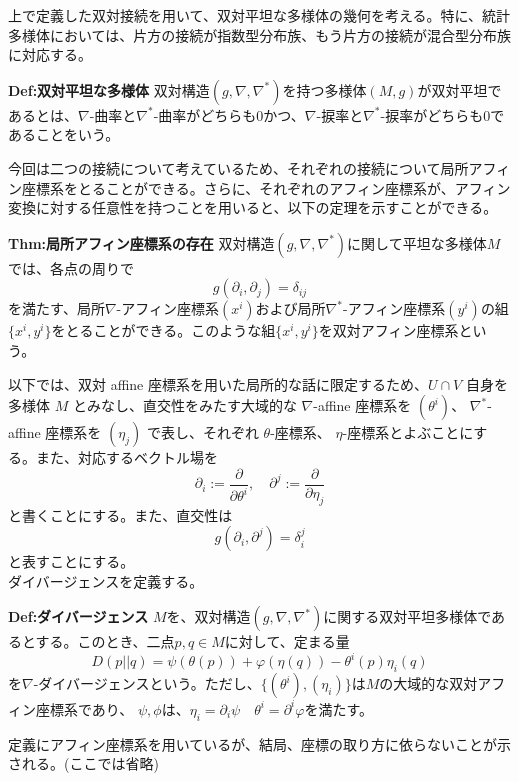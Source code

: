 \documentclass[a4paper,11pt]{jsarticle}
\numberwithin{equation}{section}
\begin{document}
上で定義した双対接続を用いて、双対平坦な多様体の幾何を考える。特に、統計多様体においては、片方の接続が指数型分布族、もう片方の接続が混合型分布族に対応する。\\
\begin{itembox}[l]{\textbf{Def:双対平坦な多様体}}
    双対構造$(g,\nabla,\nabla^*)$を持つ多様体$(M,g)$が双対平坦であるとは、$\nabla$-曲率と$\nabla^*$-曲率がどちらも0かつ、$\nabla$-捩率と$\nabla^*$-捩率がどちらも0であることをいう。
\end{itembox}
今回は二つの接続について考えているため、それぞれの接続について局所アフィン座標系をとることができる。さらに、それぞれのアフィン座標系が、アフィン変換に対する任意性を持つことを用いると、以下の定理を示すことができる。
\begin{itembox}[l]{\textbf{Thm:局所アフィン座標系の存在}}
    双対構造$(g,\nabla,\nabla^*)$に関して平坦な多様体$M$では、各点の周りで
    \begin{equation}
        g(\partial_i,\partial_j) = \delta_{ij}
    \end{equation}
    を満たす、局所$\nabla$-アフィン座標系$(x^i)$および局所$\nabla^*$-アフィン座標系$(y^i)$の組$\{x^i,y^i\}$をとることができる。このような組$\{x^i,y^i\}$を双対アフィン座標系という。 
\end{itembox}
    
    以下では、双対 affine 座標系を用いた局所的な話に限定するため、\( U \cap V \) 自身を多様体 \( M \) とみなし、直交性をみたす大域的な \( \nabla \)-affine 座標系を \((\theta^i)\)、 \( \nabla^*\)-affine 座標系を \((\eta_j)\) で表し、それぞれ \(\theta\)-座標系、 \(\eta\)-座標系とよぶことにする。また、対応するベクトル場を
    \begin{equation}
    \partial_i := \frac{\partial}{\partial \theta^i}, \quad \partial^j := \frac{\partial}{\partial \eta_j} \tag{4.40}
    \end{equation}
    と書くことにする。また、直交性は
    \begin{equation}
    g(\partial_i, \partial^j) = \delta_i^j 
    \end{equation}
    と表すことにする。\\
    ダイバージェンスを定義する。

    \begin{itembox}[l]{\textbf{Def:ダイバージェンス}}
        $M$を、双対構造$(g,\nabla,\nabla^*)$に関する双対平坦多様体であるとする。このとき、二点$p,q \in M$に対して、定まる量
        \begin{equation}
            D(p||q) = \psi(\theta(p)) + \varphi(\eta(q)) - \theta^i(p)\eta_i(q)
        \end{equation}
        を$\nabla$-ダイバージェンスという。ただし、$\{(\theta ^i),(\eta_i)\}$は$M$の大域的な双対アフィン座標系であり、
        $\psi,\phi$は、$\eta_i = \partial_i \psi \quad \theta^i = \partial^i \varphi$を満たす。
    \end{itembox}
    定義にアフィン座標系を用いているが、結局、座標の取り方に依らないことが示される。(ここでは省略)\\
    
\end{document}
